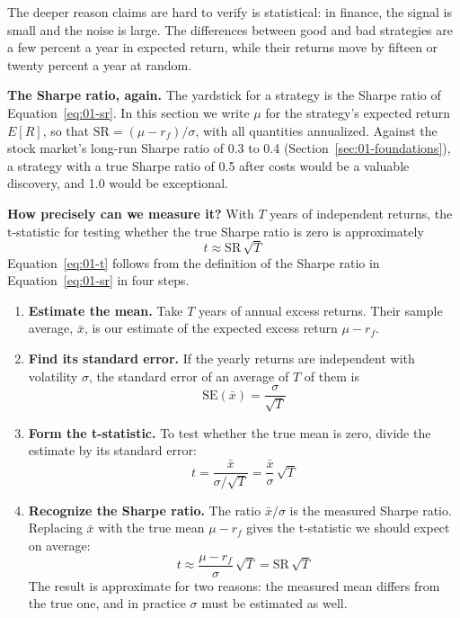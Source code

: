 The deeper reason claims are hard to verify is statistical: in finance, the signal is small and the noise is large. The differences between good and bad strategies are a few percent a year in expected return, while their returns move by fifteen or twenty percent a year at random.

\textbf{The Sharpe ratio, again.} The yardstick for a strategy is the Sharpe ratio of Equation~\eqref{eq:01-sr}. In this section we write $\mu$ for the strategy's expected return $E[R]$, so that $\mathrm{SR} = (\mu - r_f)/\sigma$, with all quantities annualized. Against the stock market's long-run Sharpe ratio of 0.3 to 0.4 (Section~\ref{sec:01-foundations}), a strategy with a true Sharpe ratio of 0.5 after costs would be a valuable discovery, and 1.0 would be exceptional.

\textbf{How precisely can we measure it?} With $T$ years of independent returns, the t-statistic for testing whether the true Sharpe ratio is zero is approximately
\begin{equation}
  t \approx \mathrm{SR}\,\sqrt{T}
  \label{eq:01-t}
\end{equation}
Equation~\eqref{eq:01-t} follows from the definition of the Sharpe ratio in Equation~\eqref{eq:01-sr} in four steps.

\begin{enumerate}
  \item \textbf{Estimate the mean.} Take $T$ years of annual excess returns. Their sample average, $\bar{x}$, is our estimate of the expected excess return $\mu - r_f$.
  \item \textbf{Find its standard error.} If the yearly returns are independent with volatility $\sigma$, the standard error of an average of $T$ of them is
  \begin{equation}
    \mathrm{SE}(\bar{x}) = \frac{\sigma}{\sqrt{T}} \nonumber
  \end{equation}
  \item \textbf{Form the t-statistic.} To test whether the true mean is zero, divide the estimate by its standard error:
  \begin{equation}
    t = \frac{\bar{x}}{\sigma/\sqrt{T}} = \frac{\bar{x}}{\sigma}\,\sqrt{T} \nonumber
  \end{equation}
  \item \textbf{Recognize the Sharpe ratio.} The ratio $\bar{x}/\sigma$ is the measured Sharpe ratio. Replacing $\bar{x}$ with the true mean $\mu - r_f$ gives the t-statistic we should expect on average:
  \begin{equation}
    t \approx \frac{\mu - r_f}{\sigma}\,\sqrt{T} = \mathrm{SR}\,\sqrt{T} \nonumber
  \end{equation}
  The result is approximate for two reasons: the measured mean differs from the true one, and in practice $\sigma$ must be estimated as well.
\end{enumerate}

